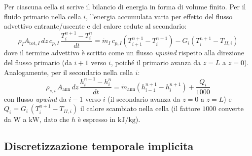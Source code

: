 \documentclass[12pt]{report}
\begin{document}
Per ciascuna cella si scrive il bilancio di energia in forma di volume finito. Per il fluido primario nella cella $i$, l'energia accumulata varia per effetto del flusso advettivo entrante/uscente e del calore cedute al secondario:
\begin{equation}
    \rho_I A_{\text{tot},I}\, dz\, c_{p,I} \,\frac{T_i^{n+1}-T_i^{n}}{dt}
    = \dot m_I\, c_{p,I}\left(T_{i+1}^{n+1} - T_i^{n+1}\right) - G_i\left(T_i^{n+1} - T_{II,i}\right)
    \label{eq:bilancio_primario_continuo}
\end{equation}
dove il termine advettivo è scritto come un flusso \textit{upwind} rispetto alla direzione del flusso primario (da $i+1$ verso $i$, poiché il primario avanza da $z=L$ a $z=0$). Analogamente, per il secondario nella cella $i$:
\begin{equation}
    \rho_{s,i}\, A_{\text{ann}}\, dz\,\frac{h_i^{n+1}-h_i^{n}}{dt}
    = \dot m_{\text{ann}}\left(h_{i-1}^{n+1} - h_i^{n+1}\right) + \frac{Q_i}{1000}
    \label{eq:bilancio_secondario_continuo}
\end{equation}
con flusso \textit{upwind} da $i-1$ verso $i$ (il secondario avanza da $z=0$ a $z=L$) e $Q_i = G_i\,(T_i^{n+1}-T_{II,i})$ il calore scambiato nella cella (il fattore $1000$ converte da $\si{\watt}$ a $\si{\kilo\watt}$, dato che $h$ è espresso in $\si{\kilo\joule\per\kilo\gram}$).

\subsection{Discretizzazione temporale implicita}
\end{document}
